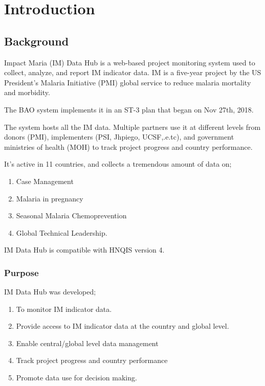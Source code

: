 \documentclass[]{book}
\providecommand{\tightlist}{%
  \setlength{\itemsep}{0pt}\setlength{\parskip}{0pt}}
\begin{document}
\hypertarget{intro}{%
\chapter{Introduction}\label{intro}}

\hypertarget{background}{%
\section{Background}\label{background}}

Impact Maria (IM) Data Hub is a web-based project monitoring system used to collect, analyze, and report IM indicator data. IM is a five-year project by the US President's Malaria Initiative (PMI) global service to reduce malaria mortality and morbidity.

The BAO system implements it in an ST-3 plan that began on Nov 27th, 2018.

The system hosts all the IM data. Multiple partners use it at different levels from donors (PMI), implementers (PSI, Jhpiego, UCSF,.e.tc), and government ministries of health (MOH) to track project progress and country performance.

It's active in 11 countries, and collects a tremendous amount of data on;

\begin{enumerate}
\def\labelenumi{\arabic{enumi}.}
\tightlist
\item
  Case Management
\item
  Malaria in pregnancy
\item
  Seasonal Malaria Chemoprevention
\item
  Global Technical Leadership.
\end{enumerate}

IM Data Hub is compatible with HNQIS version 4.

\hypertarget{purpose}{%
\subsection{Purpose}\label{purpose}}

IM Data Hub was developed;

\begin{enumerate}
\def\labelenumi{\arabic{enumi}.}
\tightlist
\item
  To monitor IM indicator data.
\item
  Provide access to IM indicator data at the country and global level.
\item
  Enable central/global level data management
\item
  Track project progress and country performance
\item
  Promote data use for decision making.
\end{enumerate}
\end{document}
